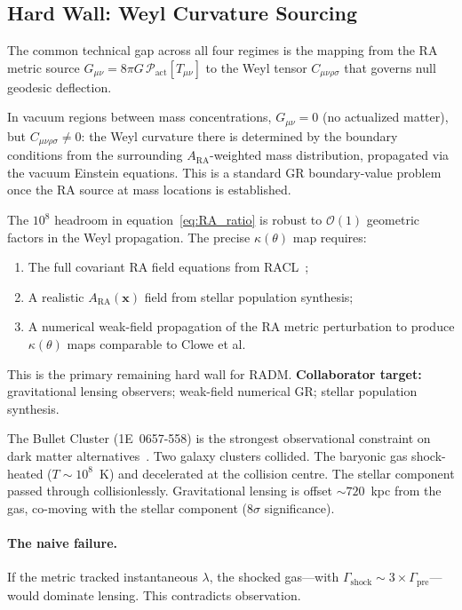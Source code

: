 \documentclass[11pt,a4paper]{article}
\theoremstyle{plain}
\theoremstyle{definition}
\theoremstyle{remark}
\newcommand{\Pact}{\mathcal{P}_{\mathrm{act}}}
\begin{document}
\subsection{Hard Wall: Weyl Curvature Sourcing}
\label{sec:HW_weyl}

The common technical gap across all four regimes is the mapping from the
RA metric source $G_{\mu\nu} = 8\pi G\,\Pact[T_{\mu\nu}]$ to the
Weyl tensor $C_{\mu\nu\rho\sigma}$ that governs null geodesic deflection.

In vacuum regions between mass concentrations, $G_{\mu\nu} = 0$
(no actualized matter), but $C_{\mu\nu\rho\sigma} \neq 0$:
the Weyl curvature there is determined by the boundary conditions
from the surrounding $A_{\mathrm{RA}}$-weighted mass distribution,
propagated via the vacuum Einstein equations. This is a standard GR
boundary-value problem once the RA source at mass locations is established.

The $10^8$ headroom in equation~\eqref{eq:RA_ratio} is robust to
$\mathcal{O}(1)$ geometric factors in the Weyl propagation.
The precise $\kappa(\theta)$ map requires:
\begin{enumerate}[noitemsep]
  \item The full covariant RA field equations from RACL~\citep{Sandeman2026RACL};
  \item A realistic $A_{\mathrm{RA}}(\mathbf{x})$ field from stellar
        population synthesis;
  \item A numerical weak-field propagation of the RA metric perturbation
        to produce $\kappa(\theta)$ maps comparable to Clowe et al.
\end{enumerate}
This is the primary remaining hard wall for RADM.
\textbf{Collaborator target:} gravitational lensing observers;
weak-field numerical GR; stellar population synthesis.



The Bullet Cluster (1E~0657-558) is the strongest observational constraint on dark
matter alternatives~\citep{Clowe2006}. Two galaxy clusters collided. The baryonic
gas shock-heated ($T \sim 10^8$~K) and decelerated at the collision centre. The
stellar component passed through collisionlessly. Gravitational lensing is offset
$\sim 720$~kpc from the gas, co-moving with the stellar component (8$\sigma$
significance).

\paragraph{The naive failure.}
If the metric tracked instantaneous $\lambda$, the shocked gas---with
$\Gamma_{\mathrm{shock}} \sim 3\times\Gamma_{\mathrm{pre}}$---would dominate
lensing. This contradicts observation.
\end{document}
